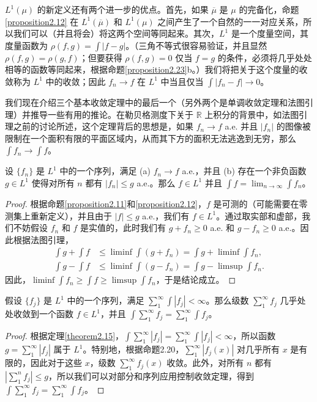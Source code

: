 \documentclass[lang=cn,10pt,thmcnt=section]{elegantbook}
\begin{document}
$L^1(\mu)$ 的新定义还有两个进一步的优点。首先，如果 $\overline{\mu}$ 是 $\mu$ 的完备化，命题\ref{proposition2.12} 在 $L^1(\overline{\mu})$ 和 $L^1(\mu)$ 之间产生了一个自然的一一对应关系，所以我们可以（并且将会）将这两个空间等同起来。其次，$L^1$ 是一个度量空间，其度量函数为 $\rho(f,g) = \int |f-g|$。（三角不等式很容易验证，并且显然 $\rho(f,g)=\rho(g,f)$；但要获得 $\rho(f,g)=0$ 仅当 $f=g$ 的条件，必须将几乎处处相等的函数等同起来，根据命题\ref{proposition2.23}b。）我们将把关于这个度量的收敛称为 $L^1$ 中的收敛；因此 $f_n \to f$ 在 $L^1$ 中当且仅当 $\int |f_n - f| \to 0$。

我们现在介绍三个基本收敛定理中的最后一个（另外两个是单调收敛定理和法图引理）并推导一些有用的推论。在勒贝格测度下关于 $\mathbb{R}$ 上积分的背景中，如法图引理之前的讨论所述，这个定理背后的思想是，如果 $f_n \to f$ a.e. 并且 $|f_n|$ 的图像被限制在一个面积有限的平面区域内，从而其下方的面积无法逃逸到无穷，那么 $\int f_n \to \int f$。



\begin{theorem}[控制收敛定理]\label{theorem2.24}
设 $\{f_n\}$ 是 $L^1$ 中的一个序列，满足 (a) $f_n \to f$ a.e.，并且 (b) 存在一个非负函数 $g \in L^1$ 使得对所有 $n$ 都有 $|f_n| \le g$ a.e.。那么 $f \in L^1$ 并且 $\int f = \lim_{n\to\infty} \int f_n$。
\end{theorem}

\begin{proof}
根据命题\ref{proposition2.11}和\ref{proposition2.12}，$f$ 是可测的（可能需要在零测集上重新定义），并且由于 $|f| \le g$ a.e.，我们有 $f \in L^1$。通过取实部和虚部，我们不妨假设 $f_n$ 和 $f$ 是实值的，此时我们有 $g+f_n \ge 0$ a.e. 和 $g-f_n \ge 0$ a.e.。因此根据法图引理，
\begin{align*}
    \int g + \int f &\le \liminf \int(g+f_n) = \int g + \liminf \int f_n, \\
    \int g - \int f &\le \liminf \int(g-f_n) = \int g - \limsup \int f_n.
\end{align*}
因此，$\liminf \int f_n \ge \int f \ge \limsup \int f_n$，于是结论成立。
\end{proof}

\begin{theorem}\label{theorem2.25}
假设 $\{f_j\}$ 是 $L^1$ 中的一个序列，满足 $\sum_1^\infty \int |f_j| < \infty$。那么级数 $\sum_1^\infty f_j$ 几乎处处收敛到一个函数 $f \in L^1$，并且 $\int \sum_1^\infty f_j = \sum_1^\infty \int f_j$。
\end{theorem}

\begin{proof}
根据定理\ref{theorem2.15}，$\int \sum_1^\infty |f_j| = \sum_1^\infty \int |f_j| < \infty$，所以函数 $g = \sum_1^\infty |f_j|$ 属于 $L^1$。特别地，根据命题2.20，$\sum_1^\infty |f_j(x)|$ 对几乎所有 $x$ 是有限的，因此对于这些 $x$，级数 $\sum_1^\infty f_j(x)$ 收敛。此外，对所有 $n$ 都有 $|\sum_1^n f_j| \le g$，所以我们可以对部分和序列应用控制收敛定理，得到 $\int \sum_1^\infty f_j = \sum_1^\infty \int f_j$。
\end{proof}
\end{document}
